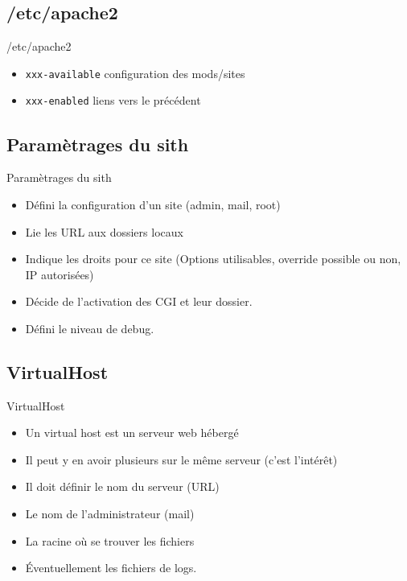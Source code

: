 \begin{frame}[containsverbatim]{\sectitle}
    \def\subsectitle{/etc/apache2}
    \subsection{\subsectitle}
    \begin{block}{\subsectitle}
        \begin{itemize}
            \item \verb+xxx-available+ configuration des mods/sites
            \item \verb+xxx-enabled+ liens vers le précédent
        \end{itemize}
    \end{block}
    \def\subsectitle{Paramètrages du sith}
    \subsection{\subsectitle}
    \begin{block}{\subsectitle}
        \begin{itemize}
            \item Défini la configuration d'un site (admin, mail, root)
            \item Lie les URL aux dossiers locaux
            \item Indique les droits pour ce site (Options utilisables, override
                possible ou non, IP autorisées)
            \item Décide de l'activation des CGI et leur dossier.
            \item Défini le niveau de debug.
        \end{itemize}
    \end{block}
\end{frame}

\begin{frame}{\sectitle}
    \def\subsectitle{VirtualHost}
    \subsection{\subsectitle}
    \begin{block}{\subsectitle}
        \begin{itemize}
            \item Un virtual host est un serveur web hébergé
            \item Il peut y en avoir plusieurs sur le même serveur (c'est
                l'intérêt)
            \item Il doit définir le nom du serveur (URL)
            \item Le nom de l'administrateur (mail)
            \item La racine où se trouver les fichiers
            \item Éventuellement les fichiers de logs.
        \end{itemize}
    \end{block}
\end{frame}

